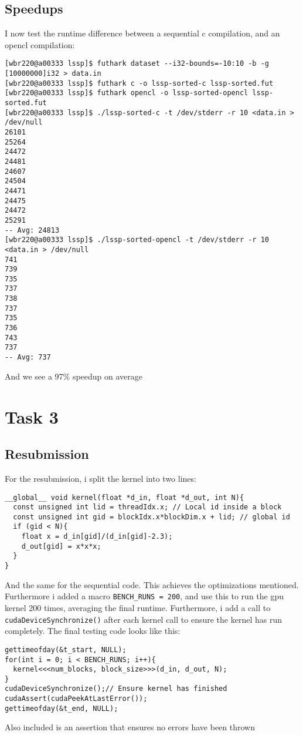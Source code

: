 \documentclass[11pt]{article}
\begin{document}
\subsection{Speedups}
\label{sec:org892111c}
I now test the runtime difference between a sequential c compilation, and an opencl compilation:
\begin{verbatim}
[wbr220@a00333 lssp]$ futhark dataset --i32-bounds=-10:10 -b -g [10000000]i32 > data.in
[wbr220@a00333 lssp]$ futhark c -o lssp-sorted-c lssp-sorted.fut
[wbr220@a00333 lssp]$ futhark opencl -o lssp-sorted-opencl lssp-sorted.fut
[wbr220@a00333 lssp]$ ./lssp-sorted-c -t /dev/stderr -r 10 <data.in > /dev/null
26101
25264
24472
24481
24607
24504
24471
24475
24472
25291
-- Avg: 24813
[wbr220@a00333 lssp]$ ./lssp-sorted-opencl -t /dev/stderr -r 10 <data.in > /dev/null
741
739
735
737
738
737
735
736
743
737
-- Avg: 737
\end{verbatim}
And we see a 97\% speedup on average

\section{Task 3}
\label{sec:org3362658}
\subsection{Resubmission}
\label{sec:org4f9fcf4}
For the resubmission, i split the kernel into two lines:
\begin{verbatim}
__global__ void kernel(float *d_in, float *d_out, int N){
  const unsigned int lid = threadIdx.x; // Local id inside a block
  const unsigned int gid = blockIdx.x*blockDim.x + lid; // global id
  if (gid < N){
    float x = d_in[gid]/(d_in[gid]-2.3);
    d_out[gid] = x*x*x;
  }
}
\end{verbatim}
And the same for the sequential code. This achieves the optimizations mentioned. Furthermore
i added a macro \texttt{BENCH\_RUNS = 200}, and use this to run the gpu kernel 200 times, averaging
the final runtime. Furthermore, i add a call to \texttt{cudaDeviceSynchronize()} after each kernel 
call to ensure the kernel has run completely. The final testing code looks like this:
\begin{verbatim}
gettimeofday(&t_start, NULL);
for(int i = 0; i < BENCH_RUNS; i++){
  kernel<<<num_blocks, block_size>>>(d_in, d_out, N);
}
cudaDeviceSynchronize();// Ensure kernel has finished
cudaAssert(cudaPeekAtLastError());
gettimeofday(&t_end, NULL);
\end{verbatim}
Also included is an assertion that ensures no errors have been thrown
\end{document}
